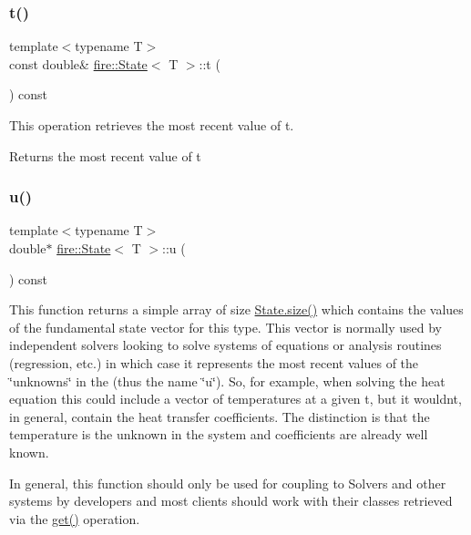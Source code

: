 \subsubsection{\texorpdfstring{t()}{t()}\hspace{0.1cm}{\footnotesize\ttfamily [2/2]}}
{\footnotesize\ttfamily template$<$typename T$>$ \\
const double\& \hyperlink{a00818}{fire\+::\+State}$<$ T $>$\+::t (\begin{DoxyParamCaption}{ }\end{DoxyParamCaption}) const\hspace{0.3cm}{\ttfamily [inline]}}

This operation retrieves the most recent value of t. \begin{DoxyReturn}{Returns}
the most recent value of t 
\end{DoxyReturn}
\mbox{\label{a00818_a54507a9e31127580a2c485ce9829934e}} 
\subsubsection{\texorpdfstring{u()}{u()}\hspace{0.1cm}{\footnotesize\ttfamily [1/3]}}
{\footnotesize\ttfamily template$<$typename T$>$ \\
double$\ast$ \hyperlink{a00818}{fire\+::\+State}$<$ T $>$\+::u (\begin{DoxyParamCaption}{ }\end{DoxyParamCaption}) const\hspace{0.3cm}{\ttfamily [inline]}}

This function returns a simple array of size \hyperlink{a00818_a22b2d9e2feb153c819e90a4ac7ee8d72}{State.\+size()} which contains the values of the fundamental state vector for this type. This vector is normally used by independent solvers looking to solve systems of equations or analysis routines (regression, etc.) in which case it represents the most recent values of the \char`\"{}unknowns\char`\"{} in the (thus the name \char`\"{}u\char`\"{}). So, for example, when solving the heat equation this could include a vector of temperatures at a given t, but it wouldn\textquotesingle{}t, in general, contain the heat transfer coefficients. The distinction is that the temperature is the unknown in the system and coefficients are already well known.

In general, this function should only be used for coupling to Solvers and other systems by developers and most clients should work with their classes retrieved via the \hyperlink{a00818_a71cec682edafbf5c3b09e9d6dc91f12b}{get()} operation.

